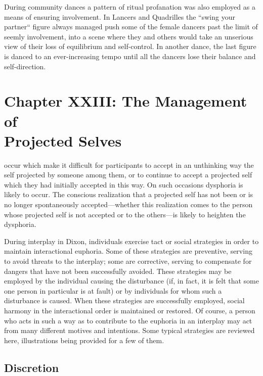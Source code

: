 \documentclass[twoside,symmetric,nobib,justified]{tufte-book}
\let\oldchapter\chapter
\def\chapter{%
  \setcounter{footnote}{0}%
  \oldchapter
}
\begin{document}
During community dances a pattern of ritual profanation was also
employed as a means of ensuring involvement. In Lancers and Quadrilles
the ``swing your partner`` figure always managed push some of the female
dancers past the limit of seemly involvement, into a scene where they
and others would take an unserious view of their loss of equilibrium and
self-control. In another dance, the last figure is danced to an
ever-increasing tempo until all the dancers lose their balance and
self-direction.

    


\chapter[CHAPTER XXIII: THE MANAGEMENT OF PROJECTED SELVES]{Chapter XXIII: The Management of\\Projected Selves}
\label{ch:Chapter XXIII: The Management of Projected Selves}


 occur which make it difficult for
participants to accept in an unthinking way the self projected by
someone among them, or to continue to accept a projected self which they
had initially accepted in this way. On such occasions dysphoria is
likely to occur. The conscious realization that a projected self has not
been or is no longer spontaneously accepted---whether this realization
comes to the person whose projected self is not accepted or to the
others---is likely to heighten the dysphoria.

During interplay in Dixon, individuals exercise tact or social
strategies in order to maintain interactional euphoria. Some of these
strategies are preventive, serving to avoid threats to the interplay;
some are corrective, serving to compensate for dangers that have not
been successfully avoided. These strategies may be employed by the
individual causing the disturbance (if, in fact, it is felt that some
one person in particular is at fault) or by individuals for whom such a
disturbance is caused. When these strategies are successfully employed,
social harmony in the interactional order is maintained or restored. Of
course, a person who acts in such a way as to contribute to the euphoria
in an interplay may act from many different motives and intentions. Some
typical strategies are reviewed here, illustrations being provided for a
few of them.

\hypertarget{discretion}{%
\section{Discretion}\label{discretion}}
\end{document}
